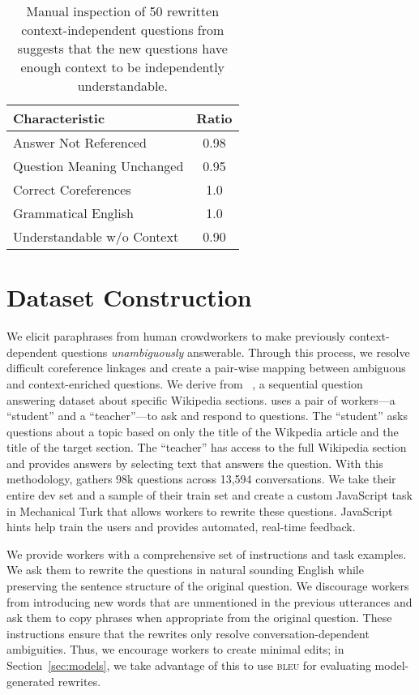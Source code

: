 
\begin{table}[t]
	\centering
	\begin{tabular}{l c}
	\textbf{	Characteristic }& \textbf{Ratio}\\
		\hline
		Answer Not Referenced & 0.98 \\
		Question Meaning Unchanged &  0.95 \\
		Correct Coreferences & 1.0 \\
		Grammatical English & 1.0 \\
		Understandable w/o Context & 0.90 \\
	\end{tabular}
    \caption{Manual inspection of 50 rewritten context-independent questions from \name{} suggests that the new questions have enough context to be independently understandable.}
    \label{tab:manualreview}
\end{table}

\section{Dataset Construction 
	\label{sec:data}}

We elicit paraphrases from human crowdworkers to make previously
context-dependent questions \textit{unambiguously} answerable.
%
Through this process, we resolve difficult coreference linkages and
create a pair-wise mapping between ambiguous and context-enriched
questions.
%
We derive \name{} from \abr{\quac}~\citep{choi2018quac}, a sequential
question answering dataset about specific Wikipedia sections.
%
\abr{\quac} uses a pair of workers---a ``student'' and a ``teacher''---to ask
and respond to questions.
%
The ``student'' asks questions about a topic based on only the title
of the Wikpedia article and the title of the target section.
%
The ``teacher'' has access to the full Wikipedia section and provides answers by selecting text that answers the question.
%
With this methodology, \abr{\quac} gathers 98k questions across 13,594 conversations.
%
We take their entire dev set and a sample of their train set and
create a custom JavaScript task in Mechanical Turk that allows
workers to rewrite these questions.
%
JavaScript hints help train the users and provides automated, real-time feedback.

We provide workers with a comprehensive set of instructions and task examples. 
We ask them to rewrite the questions in natural sounding English while preserving the sentence structure of the original question.  We discourage workers from introducing new words that are unmentioned
in the previous utterances and ask them to copy phrases when appropriate from the original question.
%
These instructions ensure that the rewrites only resolve
conversation-dependent ambiguities.
%
Thus, we encourage workers to create minimal edits; in
Section~\ref{sec:models}, we take advantage of this to use
\textsc{bleu} for evaluating model-generated rewrites.



